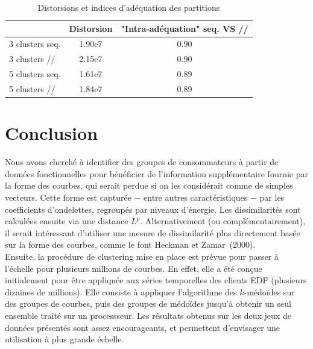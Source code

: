 \documentclass[12pt]{article}
\begin{document}
\begin{table}[H]
\centering
\begin{tabular}{|l|c|c|}
\hline
 & Distorsion & "Intra-adéquation" seq. VS //\\
\hline
3 clusters seq. & 1.90e7 & 0.90\\
\hline
3 clusters // & 2.15e7 & 0.90\\
\hline
5 clusters seq. & 1.61e7 & 0.89\\
\hline
5 clusters // & 1.84e7 & 0.89\\
\hline
\end{tabular}
\caption{Distorsions et indices d'adéquation des partitions}
\label{tabDistorIr}
\end{table}

\section{Conclusion}

Nous avons cherché à identifier des groupes de consommateurs à partir de données fonctionnelles 
pour bénéficier de l'information supplémentaire fournie par la forme des courbes, qui serait perdue 
si on les considérait comme de simples vecteurs. Cette forme est capturée $-$ entre autres caractéristiques $-$ 
par les coefficients d'ondelettes, regroupés par niveaux d'énergie. Les dissimilarités sont calculées ensuite 
via une distance $L^p$. Alternativement (ou complémentairement), il serait intéressant d'utiliser une mesure de dissimilarité 
plus directement basée sur la forme des courbes, comme le font Heckman et Zamar~(2000).\\

Ensuite, la procédure de clustering mise en place est prévue pour passer à l'échelle pour plusieurs millions de courbes. 
En effet, elle a été conçue initialement pour être appliquée aux séries temporelles des clients EDF (plusieurs dizaines de millions). 
Elle consiste à appliquer l'algorithme des $k$-médoïdes sur des groupes de courbes, puis des groupes de médoïdes 
jusqu'à obtenir un seul ensemble traité sur un processseur.
Les résultats obtenus sur les deux jeux de données présentés sont assez encourageants, et permettent d'envisager une utilisation à plus grande échelle.

\end{document}
